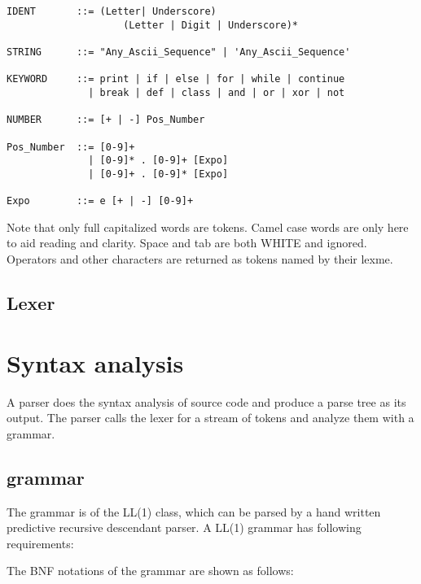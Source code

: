 \documentclass[10pt,a4paper]{article}
\begin{document}
\begin{verbatim}
IDENT       ::= (Letter| Underscore) 
                    (Letter | Digit | Underscore)*

STRING      ::= "Any_Ascii_Sequence" | 'Any_Ascii_Sequence'

KEYWORD     ::= print | if | else | for | while | continue 
              | break | def | class | and | or | xor | not
              
NUMBER      ::= [+ | -] Pos_Number

Pos_Number  ::= [0-9]+ 
              | [0-9]* . [0-9]+ [Expo] 
              | [0-9]+ . [0-9]* [Expo]

Expo        ::= e [+ | -] [0-9]+
\end{verbatim}

Note that only full capitalized words are tokens. Camel case words
are only here to aid reading and clarity. 
Space and tab are both WHITE and ignored. Operators and other characters
are returned as tokens named by their lexme.

\subsection{Lexer}

\pagebreak


\section{Syntax analysis}
A parser does the syntax analysis of source code and produce a parse tree
as its output. The parser calls the lexer for a stream of tokens and 
analyze them with a grammar.

\subsection{grammar}
The grammar is of the LL(1) class, which can be parsed by a hand written 
predictive recursive descendant parser. 
A LL(1) grammar has following requirements:

The BNF notations of the grammar are shown as follows:
\end{document}
